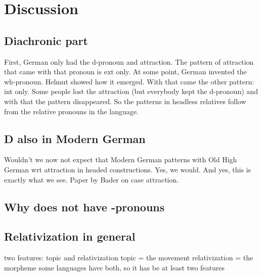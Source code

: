 
\chapter{Discussion}\label{ch:discussion}

\section{Diachronic part}

First, German only had the d-pronoun and attraction. The pattern of attraction that came with that pronoun is ext only.
At some point, German invented the wh-pronoun. Helmut showed how it emerged. With that came the other pattern: int only. Some people lost the attraction (but everybody kept the d-pronoun) and with that the pattern disappeared.
So the patterns in headless relatives follow from the relative pronouns in the language.

\section{D also in Modern German}

Wouldn't we now not expect that Modern German patterns with Old High German wrt attraction in headed constructions. Yes, we would. And yes, this is exactly what we see. Paper by Bader on case attraction.

\section{Why  does not have -pronouns}

\section{Relativization in general}

two features: topic and relativization
topic = the movement
relativization = the morpheme
some languages have both, so it has be at least two features
